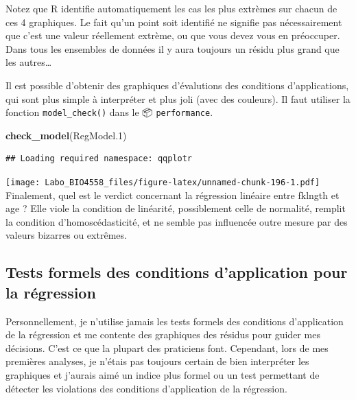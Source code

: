 \documentclass[
  12pt,
]{book}
\makeatletter
\newenvironment{Shaded}{\begin{snugshade}}{\end{snugshade}}
\newcommand{\FloatTok}[1]{\textcolor[rgb]{0.00,0.00,0.81}{#1}}
\newcommand{\KeywordTok}[1]{\textcolor[rgb]{0.13,0.29,0.53}{\textbf{#1}}}
\newcommand{\NormalTok}[1]{#1}
\newenvironment{kframe}{%
\medskip{}
\setlength{\fboxsep}{.8em}
\def\at@end@of@kframe{}%
\ifinner\ifhmode%
 \def\at@end@of@kframe{\end{minipage}}%
 \begin{minipage}{\columnwidth}%
\fi\fi%
\def\FrameCommand##1{\hskip\@totalleftmargin \hskip-\fboxsep
\colorbox{incolor}{##1}\hskip-\fboxsep
    \hskip-\linewidth \hskip-\@totalleftmargin \hskip\columnwidth}%
\MakeFramed {\advance\hsize-\width
  \@totalleftmargin\z@ \linewidth\hsize
  \@setminipage}}%
{\par\unskip\endMakeFramed%
\at@end@of@kframe}
\newenvironment{rmdblock}[1]
 {
 \begin{itemize}
 \renewcommand{\labelitemi}{
   \raisebox{-.7\height}[0pt][0pt]{
     {\setkeys{Gin}{width=3em,keepaspectratio}\texttt{[image: images/\#1]}}
   }
 }
 \begin{kframe}
 \setlength{\fboxsep}{1em}
 \item
 }
 {
 \end{kframe}
 \end{itemize}
 }
\newenvironment{rmdwarning}
  {\begin{rmdblock}{warning}}
  {\end{rmdblock}}
\makeatother
\begin{document}
\begin{rmdwarning}
Notez que R identifie automatiquement les cas les plus extrèmes sur chacun de ces 4 graphiques. Le fait qu'un point soit identifié ne signifie pas nécessairement que c'est une valeur réellement extrème, ou que vous devez vous en préoccuper. Dans tous les ensembles de données il y aura toujours un résidu plus grand que les autres\ldots{}
\end{rmdwarning}

Il est possible d'obtenir des graphiques d'évalutions des conditions d'applications, qui sont plus simple à interpréter et plus joli (avec des couleurs).
Il faut utiliser la fonction \texttt{model\_check()} dans le 📦 \texttt{performance}.

\begin{Shaded}
\begin{Highlighting}[]
\KeywordTok{check\_model}\NormalTok{(RegModel}\FloatTok{.1}\NormalTok{)}
\end{Highlighting}
\end{Shaded}

\begin{verbatim}
## Loading required namespace: qqplotr
\end{verbatim}

\texttt{[image: Labo\_BIO4558\_files/figure-latex/unnamed-chunk-196-1.pdf]}
Finalement, quel est le verdict concernant la régression linéaire entre fklngth et age ? Elle viole la condition de linéarité, possiblement celle de normalité, remplit la condition d'homoscédasticité, et ne semble pas influencée outre mesure par des valeurs bizarres ou extrêmes.

\hypertarget{tests-formels-des-conditions-dapplication-pour-la-ruxe9gression}{%
\subsection{Tests formels des conditions d'application pour la régression}\label{tests-formels-des-conditions-dapplication-pour-la-ruxe9gression}}

Personnellement, je n'utilise jamais les tests formels des conditions d'application de la régression et me contente des graphiques des résidus pour guider mes décisions. C'est ce que la plupart des praticiens font. Cependant, lors de mes premières analyses, je n'étais pas toujours certain de bien interpréter les graphiques et j'aurais aimé un indice plus formel ou un test permettant de détecter les violations des conditions d'application de la régression.
\end{document}
